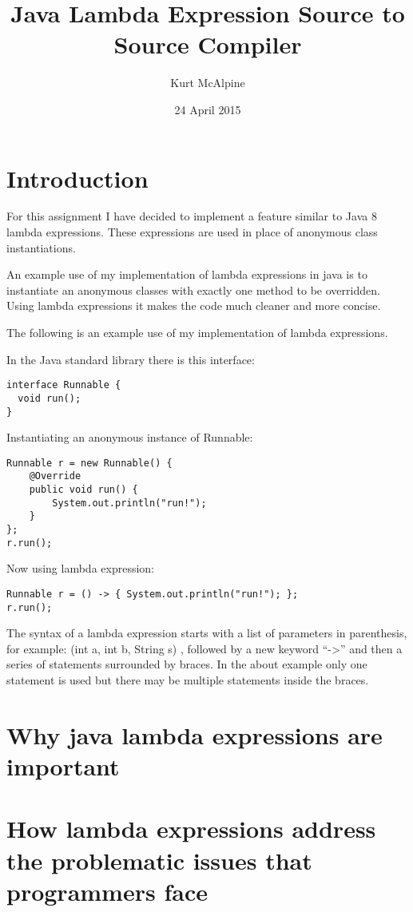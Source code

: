 \documentclass[twocolumn,notitlepage]{report}
\begin{document}
\title{Java Lambda Expression Source to Source Compiler}
\author{Kurt McAlpine}
\date{24 April 2015}
\maketitle

\section*{Introduction}
For this assignment I have decided to implement a feature similar to Java 8
lambda expressions. These expressions are used in place of anonymous class
instantiations.

An example use of my implementation of lambda expressions in java is to
instantiate an anonymous classes with exactly one method to be overridden. Using
lambda expressions it makes the code much cleaner and more
concise.\cite{Ierusalimschy:2007:EL:1238844.1238846}

The following is an example use of my implementation of lambda expressions.

In the Java standard library there is this interface:
\begin{lstlisting}
interface Runnable {
  void run();
}
\end{lstlisting}

Instantiating an anonymous instance of Runnable:
\begin{lstlisting}
Runnable r = new Runnable() {
	@Override
	public void run() {
		System.out.println("run!");
	}
};
r.run();
\end{lstlisting}
Now using lambda expression:
\begin{lstlisting}
Runnable r = () -> { System.out.println("run!"); };    	
r.run();
\end{lstlisting}

The syntax of a lambda expression starts with a list of parameters in
parenthesis, for example: {\ttfamily(int a, int b, String s)} , followed by a
new keyword ``{\ttfamily->}'' and then a series of statements surrounded by
braces. In the about example only one statement is used but there may be
multiple statements inside the braces.

\section*{Why java lambda expressions are important}

\section*{How lambda expressions address the problematic issues that programmers face}



\end{document}
